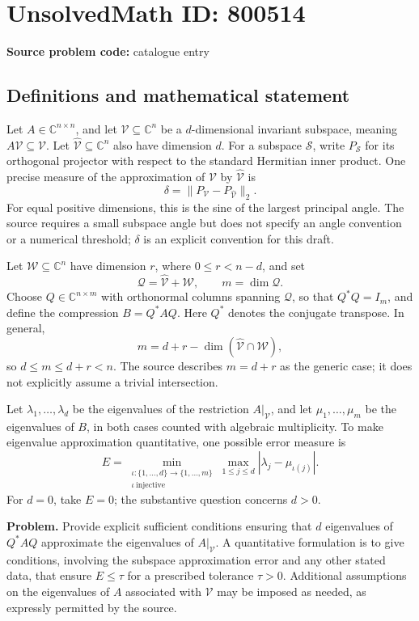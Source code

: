 \documentclass[11pt]{article}
\newcommand{\C}{\mathbb{C}}
\begin{document}
\section*{UnsolvedMath ID: 800514}
\textbf{Source problem code:} catalogue entry
\subsection{Definitions and mathematical statement}
Let \(A\in\C^{n\times n}\), and let \(\mathcal V\subseteq\C^n\) be a \(d\)-dimensional invariant subspace, meaning \(A\mathcal V\subseteq\mathcal V\). Let \(\widehat{\mathcal V}\subseteq\C^n\) also have dimension \(d\). For a subspace \(\mathcal S\), write \(P_{\mathcal S}\) for its orthogonal projector with respect to the standard Hermitian inner product. One precise measure of the approximation of \(\mathcal V\) by \(\widehat{\mathcal V}\) is
\[
\delta=\|P_{\mathcal V}-P_{\widehat{\mathcal V}}\|_2.
\]
For equal positive dimensions, this is the sine of the largest principal angle. The source requires a small subspace angle but does not specify an angle convention or a numerical threshold; \(\delta\) is an explicit convention for this draft.

Let \(\mathcal W\subseteq\C^n\) have dimension \(r\), where \(0\le r<n-d\), and set
\[
\mathcal Q=\widehat{\mathcal V}+\mathcal W,
\qquad m=\dim\mathcal Q.
\]
Choose \(Q\in\C^{n\times m}\) with orthonormal columns spanning \(\mathcal Q\), so that \(Q^*Q=I_m\), and define the compression \(B=Q^*AQ\). Here \(Q^*\) denotes the conjugate transpose. In general,
\[
m=d+r-\dim(\widehat{\mathcal V}\cap\mathcal W),
\]
so \(d\le m\le d+r<n\). The source describes \(m=d+r\) as the generic case; it does not explicitly assume a trivial intersection.

Let \(\lambda_1,\ldots,\lambda_d\) be the eigenvalues of the restriction \(A|_{\mathcal V}\), and let \(\mu_1,\ldots,\mu_m\) be the eigenvalues of \(B\), in both cases counted with algebraic multiplicity. To make eigenvalue approximation quantitative, one possible error measure is
\[
E=\min_{\substack{\iota:\{1,\ldots,d\}\to\{1,\ldots,m\}\\ \iota\ \mathrm{injective}}}
\max_{1\le j\le d}|\lambda_j-\mu_{\iota(j)}|.
\]
For \(d=0\), take \(E=0\); the substantive question concerns \(d>0\).

\textbf{Problem.} Provide explicit sufficient conditions ensuring that \(d\) eigenvalues of \(Q^*AQ\) approximate the eigenvalues of \(A|_{\mathcal V}\). A quantitative formulation is to give conditions, involving the subspace approximation error and any other stated data, that ensure \(E\le\tau\) for a prescribed tolerance \(\tau>0\). Additional assumptions on the eigenvalues of \(A\) associated with \(\mathcal V\) may be imposed as needed, as expressly permitted by the source.
\end{document}
